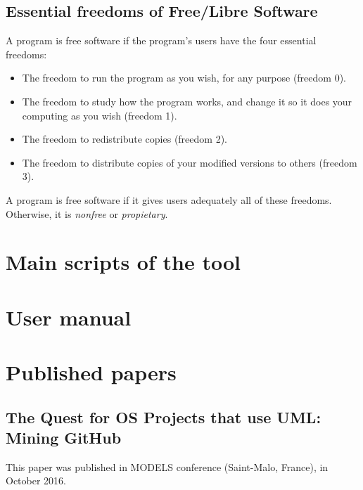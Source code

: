 \documentclass[a4paper, 12pt]{book}
\begin{document}
\section{Essential freedoms of Free/Libre Software}
\label{sec:freedoms}
A program is free software if the program's users have the four essential freedoms:
\begin{itemize}
   \item The freedom to run the program as you wish, for any purpose (freedom 0).
   \item The freedom to study how the program works, and change it so it does your computing as you wish (freedom 1).
   \item The freedom to redistribute copies (freedom 2).
   \item The freedom to distribute copies of your modified versions to others (freedom 3).
\end{itemize}
A program is free software if it gives users adequately all of these freedoms. Otherwise, it is \textit{nonfree} or \textit{propietary}.
\chapter{Main scripts of the tool}
\label{app:scripts}
\chapter{User manual}
\label{app:manual}
\chapter{Published papers}
\label{app:papers}
\section{The Quest for OS Projects that use UML: Mining GitHub}
\label{sec:paper-models}
This paper was published in MODELS conference (Saint-Malo, France), in October 2016.

\end{document}
